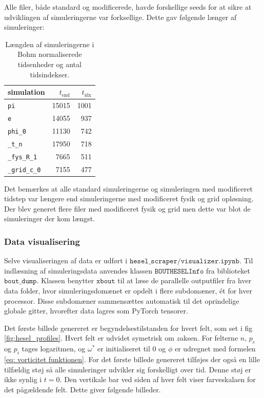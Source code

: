Alle filer, både standard og modificerede, havde forskellige seeds for at sikre at udviklingen af simuleringerne var forksellige. Dette gav følgende længer af simuleringer:
\begin{table}[H]
    \centering
    \begin{tabular}{lrr}
        \toprule
        simulation & $t_{\text{end}}$ & $t_{\text{idx}}$ \\
        \midrule
        \texttt{pi}   & 15015 & 1001 \\
        \texttt{e}    & 14055 & 937  \\
        \texttt{phi\_0}& 11130 & 742  \\
        \texttt{\_t\_n} & 17950 & 718  \\
        \texttt{\_fys\_R\_1} & 7665 & 511  \\
        \texttt{\_grid\_c\_0} & 7155 & 477  \\
        \bottomrule
    \end{tabular}
    \caption{Længden af simuleringerne i Bohm normaliserede tidsenheder og antal tidsindekser.}
    \label{tab:sim_times}
\end{table}
Det bemærkes at alle standard simuleringerne og simuleringen med modificeret tidstep var længere end simuleringerne med modificeret fysik og grid opløsning. Der blev
generet flere filer med modificeret fysik og grid men dette var blot de simuleringer der kom længst.


\subsubsection{Data visualisering}
Selve visualiseringen af data er udført i $\texttt{hesel\_scraper/visualizer.ipynb}$.
Til indlæsning af simuleringsdata anvendes klassen $\texttt{BOUTHESELInfo}$ fra biblioteket $\texttt{bout\_dump}$.
Klassen benytter $\texttt{xbout}$ til at læse de parallelle outputfiler fra hver data folder, hvor simuleringsdomænet er opdelt i flere subdomæner,
ét for hver processor. Disse subdomæner sammensættes automatisk til det oprindelige globale gitter, hvorefter data lagres som PyTorch tensorer.

Det første billede genereret er begyndelsestilstanden for hvert felt, som set i fig \ref{fig:hesel_profiles}. Hvert felt er udvidet symetrisk om $z$aksen.
For felterne $n$, $p_e$ og $p_i$ tages logaritmen, og $\omega^*$ er initialiseret til 0 og $\phi$ er udregnet med formelen \eqref{eq: vorticitet funktionen}.
For det første billede genereret tilføjes der også en lille tilfældig støj så alle simuleringer udvikler sig forskelligt over tid. Denne støj er ikke synlig i $t=0$.
Den vertikale bar ved siden af hver felt viser farveskalaen for det pågældende felt.
Dette giver følgende billeder.

